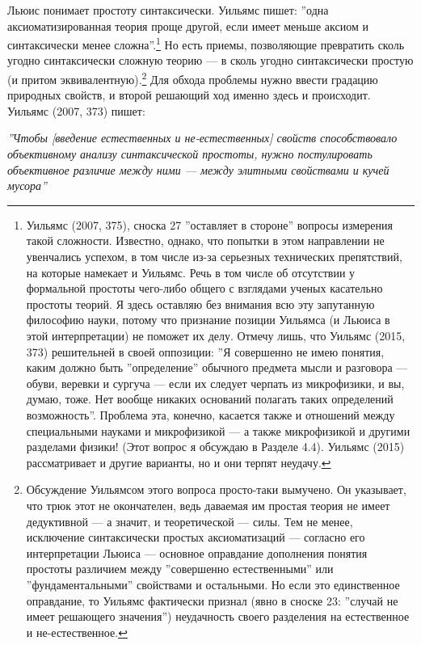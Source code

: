 \documentclass[11pt]{book}
\begin{document}
Льюис понимает простоту синтаксически. Уильямс пишет: ''одна аксиоматизированная теория проще другой, если имеет меньше аксиом и синтаксически менее сложна''.\footnote{Уильямс (2007, 375), сноска 27 ''оставляет в стороне'' вопросы измерения такой сложности. Известно, однако, что попытки в этом направлении не увенчались успехом, в том числе из-за серьезных технических препятствий, на которые намекает и Уильямс. Речь в том числе об отсутствии у формальной простоты чего-либо общего с взглядами ученых касательно простоты теорий. Я здесь оставляю без внимания всю эту запутанную философию науки, потому что признание позиции Уильямса (и Льюиса в этой интерпретации) не поможет их делу. Отмечу лишь, что Уильямс (2015, 373) решительней в своей оппозиции: ''Я совершенно не имею понятия, каким должно быть ''определение'' обычного предмета мысли и разговора --- обуви, веревки и сургуча --- если их следует черпать из микрофизики, и вы, думаю, тоже. Нет вообще никаких оснований полагать таких определений возможность''. Проблема эта, конечно, касается также и отношений между специальными науками и микрофизикой --- а также микрофизикой и другими разделами физики! (Этот вопрос я обсуждаю в Разделе 4.4). Уильямс (2015) рассматривает и другие варианты, но и они терпят неудачу.} Но есть приемы, позволяющие превратить сколь угодно синтаксически сложную теорию --- в сколь угодно синтаксически простую (и притом эквивалентную).\footnote{Обсуждение Уильямсом этого вопроса просто-таки вымучено. Он указывает, что трюк этот не окончателен, ведь даваемая им простая теория не имеет дедуктивной --- а значит, и теоретической --- силы. Тем не менее, исключение синтаксически простых аксиоматизаций --- согласно его интерпретации Льюиса --- основное оправдание дополнения понятия простоты различием между ''совершенно естественными'' или ''фундаментальными'' свойствами и остальными. Но если это единственное оправдание, то Уильямс фактически признал (явно в сноске 23: ''случай не имеет решающего значения'') неудачность своего разделения на естественное и не-естественное.} Для обхода проблемы нужно ввести градацию природных свойств, и второй решающий ход именно здесь и происходит. Уильямс (2007, 373) пишет:

\smallskip

\textit{''Чтобы [введение естественных и не-естественных] свойств способствовало объективному анализу синтаксической простоты, нужно постулировать \textit{объективное} различие между ними --- между элитными свойствами и кучей мусора''}

\smallskip
\end{document}
